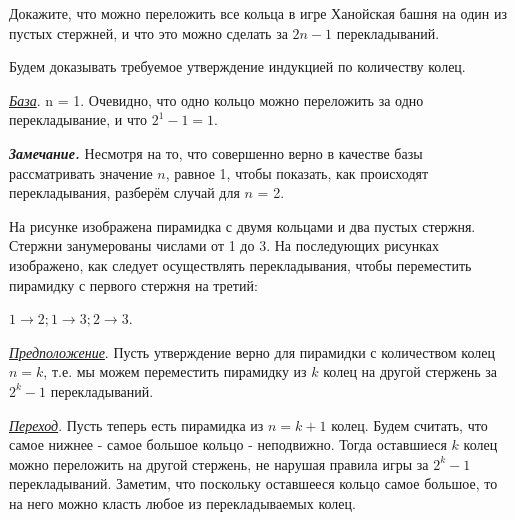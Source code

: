 {\begin{figure}[h]
\begin{minipage}{0.25\linewidth}
\end{minipage}
\end{figure}}

\begin{thm}
Докажите, что можно переложить все кольца в игре Ханойская башня на один из пустых стержней, и что это можно сделать за $2n - 1$ перекладываний.
\end{thm}

\begin{prf}
Будем доказывать требуемое утверждение индукцией по количеству колец.
\par
\textit{\underline{База}}.
n = 1. Очевидно, что одно кольцо можно переложить за одно перекладывание, и что $2^1 - 1 = 1$.
\par
\textbf{\textit{Замечание.}} Несмотря на то, что совершенно верно в качестве базы рассматривать значение $n$, равное 1, чтобы показать, как происходят перекладывания, разберём случай для $n$ = 2.
\par
На рисунке изображена пирамидка с двумя кольцами и два пустых стержня. Стержни занумерованы числами от 1 до 3. На последующих рисунках изображено, как следует осуществлять перекладывания, чтобы переместить пирамидку с первого стержня на третий:
\par
\begin{center}
    $1 \rightarrow 2; 1 \rightarrow 3; 2 \rightarrow 3$.
\end{center}
\par
\textit{\underline{Предположение}}. Пусть утверждение верно для пирамидки с количеством колец $n = k$, т.е. мы можем переместить пирамидку из $k$ колец на другой стержень за $2^k - 1$
перекладываний. 
\par
\textit{\underline{Переход}}. Пусть теперь есть пирамидка из $n = k + 1$ колец. Будем считать, что самое нижнее - самое большое кольцо - неподвижно. Тогда оставшиеся $k$ колец можно переложить на другой стержень, не нарушая правила игры за $2^k - 1$ перекладываний. Заметим, что поскольку оставшееся кольцо самое большое, то на него можно класть любое из перекладываемых колец.
\end{prf}
